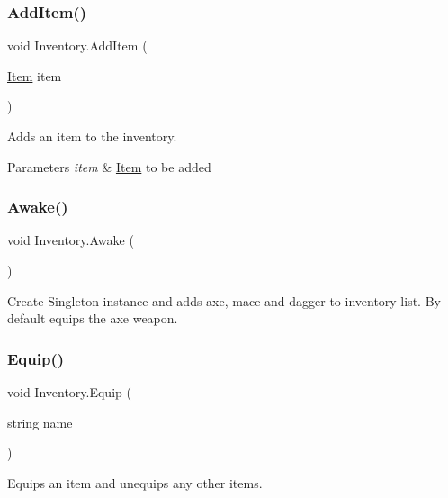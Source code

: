 \subsubsection{\texorpdfstring{AddItem()}{AddItem()}}
{\footnotesize\ttfamily void Inventory.\+Add\+Item (\begin{DoxyParamCaption}\item[{\mbox{\hyperlink{class_item}{Item}}}]{item }\end{DoxyParamCaption})}



Adds an item to the inventory. 


\begin{DoxyParams}{Parameters}
{\em item} & \mbox{\hyperlink{class_item}{Item}} to be added\\
\hline
\end{DoxyParams}
\mbox{\label{class_inventory_a88da279faf84d529af011f7e25bea01b}} 
\subsubsection{\texorpdfstring{Awake()}{Awake()}}
{\footnotesize\ttfamily void Inventory.\+Awake (\begin{DoxyParamCaption}{ }\end{DoxyParamCaption})\hspace{0.3cm}{\ttfamily [private]}}



Create Singleton instance and adds axe, mace and dagger to inventory list. By default equips the axe weapon. 

\mbox{\label{class_inventory_a951725050ee3ffb094ba575a0ccdd566}} 
\subsubsection{\texorpdfstring{Equip()}{Equip()}}
{\footnotesize\ttfamily void Inventory.\+Equip (\begin{DoxyParamCaption}\item[{string}]{name }\end{DoxyParamCaption})}



Equips an item and unequips any other items. 


